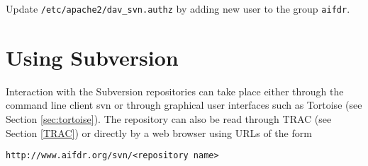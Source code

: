 Update \texttt{/etc/apache2/dav\_svn.authz} by adding new user to
the group \texttt{aifdr}. 

\section{Using Subversion}
  
Interaction with the Subversion repositories can take place either 
through the command line client svn or through graphical 
user interfaces such as Tortoise (see Section \ref{sec:tortoise}). 
The repository can also be
read through TRAC (see Section \ref{TRAC}) or 
directly by a web browser using URLs of the form
\begin{verbatim} 
http://www.aifdr.org/svn/<repository name>
\end{verbatim}   

